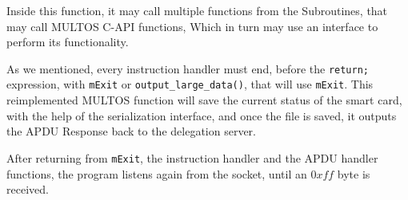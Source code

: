 Inside this function, it may call multiple functions from the Subroutines, that may call MULTOS C-API functions, Which in turn may use an interface to perform its functionality.


As we mentioned, every instruction handler must end, before the \texttt{return;} expression, with \texttt{mExit} or  \texttt{output\_large\_data()}, that will use \texttt{mExit}. This reimplemented MULTOS function will save the current status of the smart card, with the help of the serialization interface, and once the file is saved, it outputs the APDU Response back to the delegation server.

After returning from \texttt{mExit}, the instruction handler and the APDU handler functions, the program listens again from the socket, until an $0xff$ byte is received.









